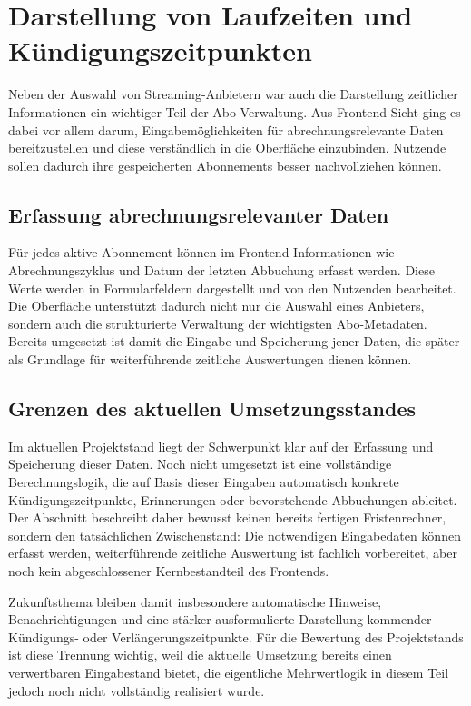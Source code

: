 \section{Darstellung von Laufzeiten und Kündigungszeitpunkten}
Neben der Auswahl von Streaming-Anbietern war auch die Darstellung zeitlicher Informationen ein wichtiger Teil der Abo-Verwaltung. Aus Frontend-Sicht ging es dabei vor allem darum, Eingabemöglichkeiten für abrechnungsrelevante Daten bereitzustellen und diese verständlich in die Oberfläche einzubinden. Nutzende sollen dadurch ihre gespeicherten Abonnements besser nachvollziehen können.

\subsection{Erfassung abrechnungsrelevanter Daten}
Für jedes aktive Abonnement können im Frontend Informationen wie Abrechnungszyklus und Datum der letzten Abbuchung erfasst werden. Diese Werte werden in Formularfeldern dargestellt und von den Nutzenden bearbeitet. Die Oberfläche unterstützt dadurch nicht nur die Auswahl eines Anbieters, sondern auch die strukturierte Verwaltung der wichtigsten Abo-Metadaten. Bereits umgesetzt ist damit die Eingabe und Speicherung jener Daten, die später als Grundlage für weiterführende zeitliche Auswertungen dienen können.

\subsection{Grenzen des aktuellen Umsetzungsstandes}
Im aktuellen Projektstand liegt der Schwerpunkt klar auf der Erfassung und Speicherung dieser Daten. Noch nicht umgesetzt ist eine vollständige Berechnungslogik, die auf Basis dieser Eingaben automatisch konkrete Kündigungszeitpunkte, Erinnerungen oder bevorstehende Abbuchungen ableitet. Der Abschnitt beschreibt daher bewusst keinen bereits fertigen Fristenrechner, sondern den tatsächlichen Zwischenstand: Die notwendigen Eingabedaten können erfasst werden, weiterführende zeitliche Auswertung ist fachlich vorbereitet, aber noch kein abgeschlossener Kernbestandteil des Frontends.

Zukunftsthema bleiben damit insbesondere automatische Hinweise, Benachrichtigungen und eine stärker ausformulierte Darstellung kommender Kündigungs- oder Verlängerungszeitpunkte. Für die Bewertung des Projektstands ist diese Trennung wichtig, weil die aktuelle Umsetzung bereits einen verwertbaren Eingabestand bietet, die eigentliche Mehrwertlogik in diesem Teil jedoch noch nicht vollständig realisiert wurde.

